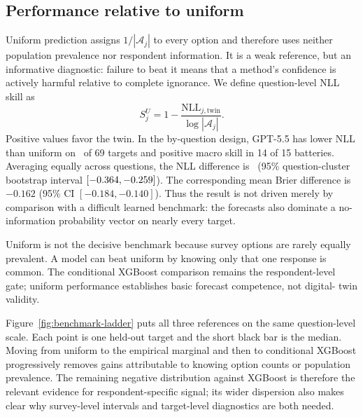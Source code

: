 \documentclass[11pt]{article}
\begin{document}
\begin{table}[ht]
\centering
\scriptsize
\resizebox{\textwidth}{!}{}
\caption{KALRO external-validation results against exact-context XGBoost and
the same-model no-persona one-shot baseline. Negative differences favor
respondent twins.}
\label{tab:kalro-extension}
\end{table}

\clearpage
\subsection{Performance relative to uniform}
Uniform prediction assigns $1/|\mathcal A_j|$ to every option and therefore
uses neither population prevalence nor respondent information. It is a weak
reference, but an informative diagnostic: failure to beat it means that a
method's confidence is actively harmful relative to complete ignorance. We
define question-level NLL skill as
\[
 S^{U}_{j}=1-\frac{\mathrm{NLL}_{j,\mathrm{twin}}}
                       {\log |\mathcal A_j|}.
\]
Positive values favor the twin. In the by-question design, GPT-5.5 has lower
NLL than uniform on \UniformQuestionsBetter\ of 69 targets and positive macro
skill in 14 of 15 batteries. Averaging equally across questions, the NLL
difference is \UniformNLLDelta\ (95\% question-cluster bootstrap interval
$[-0.364,-0.259]$). The corresponding mean Brier difference is
$-0.162$ (95\% CI $[-0.184,-0.140]$). Thus the result is not driven merely by
comparison with a difficult learned benchmark: the forecasts also dominate a
no-information probability vector on nearly every target.

Uniform is not the decisive benchmark because survey options are rarely
equally prevalent. A model can beat uniform by knowing only that one response
is common. The conditional XGBoost comparison remains the respondent-level
gate; uniform performance establishes basic forecast competence, not digital-
twin validity.

Figure~\ref{fig:benchmark-ladder} puts all three references on the same
question-level scale. Each point is one held-out target and the short black bar
is the median. Moving from uniform to the empirical marginal and then to
conditional XGBoost progressively removes gains attributable to knowing option
counts or population prevalence. The remaining negative distribution against
XGBoost is therefore the relevant evidence for respondent-specific signal; its
wider dispersion also makes clear why survey-level intervals and target-level
diagnostics are both needed.
\end{document}
